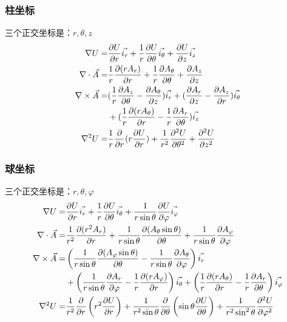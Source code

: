 \subsubsection{柱坐标}
三个正交坐标是：$r, \theta, z$
\begin{subequations}\label{eqn:field cyl}
	\begin{align}
\nabla U=&\frac{\partial U}{\partial r}\vec{i_r} +\frac{1}{r}\frac{\partial U}{\partial \theta}\vec{i_{\theta}}+\frac{\partial U}{\partial z}\vec{i_z} \\
\nabla\cdot \vec{A} =& \frac{1}{r}\frac{\partial{(r A_r)}}{\partial r} +\frac{1}{r}\frac{\partial{A_\theta}}{\partial \theta}+\frac{\partial{A_z}}{\partial z} \\
\nabla\times \vec{A}=& (\frac{1}{r}\frac{\partial{A_z}}{\partial \theta} -\frac{\partial{A_\theta}}{\partial z})\vec{i_r} + (\frac{\partial{A_r}}{\partial z} -\frac{\partial{A_z}}{\partial r}) \vec{i_\theta} \notag\\
&+ (\frac{1}{r}\frac{\partial{(r A_\theta)}}{\partial r} -\frac{1}{r}\frac{\partial{A_r}}{\partial \theta})\vec{i_z}\\
\nabla^2 U=&\frac{1}{r}\frac{\partial}{\partial r}(r\frac{\partial U}{\partial r})+\frac{1}{r^2}\frac{\partial^2 U}{\partial \theta^2}+\frac{\partial^2 U}{\partial z^2}
  	\end{align}
\end{subequations}

\subsubsection{球坐标}
三个正交坐标是：$r, \theta, \varphi$
\begin{subequations}\label{eqn:field sphl}
	\begin{align}
\nabla U=&\frac{\partial U}{\partial r}\vec{i_r} +\frac{1}{r}\frac{\partial U}{\partial \theta}\vec{i_{\theta}}+\frac{1}{r\sin\theta}\frac{\partial U}{\partial \varphi}\vec{i_\varphi}\\
\nabla\cdot \vec{A} =& \frac{1}{r^2}\frac{\partial{(r^2 A_r)}}{\partial r} +\frac{1}{r\sin\theta}\frac{\partial{(A_\theta \sin\theta)}}{\partial\theta}+\frac{1}{r\sin\theta}\frac{\partial{A_\varphi}}{\partial \varphi} \\
\nabla\times \vec{A}=& \left(\frac{1}{r\sin\theta}\frac{\partial{(A_\varphi \sin\theta)}}{\partial \theta} -\frac{1}{r\sin\theta}\frac{\partial{A_\theta}}{\partial \varphi}\right)\vec{i_r} \notag \\
& + \left(\frac{1}{r\sin\theta}\frac{\partial{A_r}}{\partial \varphi} -\frac{1}{r}\frac{\partial{(r A_\varphi)}}{\partial r}\right) \vec{i_\theta}
+ \left(\frac{1}{r}\frac{\partial{(r A_\theta)}}{\partial r} -\frac{1}{r}\frac{\partial{A_r}}{\partial \theta}\right)\vec{i_\varphi}  \\
\nabla^2 U=&\frac{1}{r^2}\frac{\partial}{\partial r}\left(r^2\frac{\partial U}{\partial r}\right)+
\frac{1}{r^2\sin\theta}\frac{\partial}{\partial\theta}\left(\sin\theta\frac{\partial U}{\partial \theta}\right)+\frac{1}{r^2\sin^2\theta}\frac{\partial^2 U}{\partial \varphi^2}
  	\end{align}
\end{subequations}

